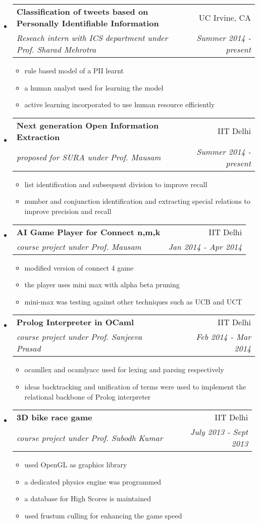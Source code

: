 \documentclass[letterpaper,11pt]{article}
\makeatletter
\newcommand{\ressubheading}[4]{
\begin{tabular*}{6.5in}{l@{\extracolsep{\fill}}r}
		\textbf{#1} & #2 \\
		\textit{#3} & \textit{#4} \\
\end{tabular*}\vspace{-6pt}}
\makeatother
\begin{document}
\begin{itemize}

\item 
\ressubheading{Classification of tweets based on Personally Identifiable Information}{UC Irvine, CA}{Reseach intern with ICS department under Prof. Sharad Mehrotra}{Summer 2014 - present}
\begin{itemize}
\item rule based model of a PII learnt
\item a human analyst used for learning the model
\item active learning incorporated to use human resource efficiently
\end{itemize}

\item
\ressubheading{Next generation Open Information Extraction}{IIT Delhi}{proposed for SURA under Prof. Mausam}{Summer 2014 - present}
\begin{itemize}
\item list identification and subsequent division to improve recall
\item number and conjunction identification and extracting special relations to improve precision and recall
\end{itemize}

\item
\ressubheading{AI Game Player for Connect n,m,k}{IIT Delhi}{course project under Prof. Mausam}{Jan 2014 - Apr 2014}
\begin{itemize}
\item modified version of connect 4 game
\item the player uses mini max with alpha beta pruning
\item mini-max was testing against other techniques such as UCB and UCT
\end{itemize}


\item
\ressubheading{Prolog Interpreter in OCaml}{IIT Delhi}{course project under Prof. Sanjeeva Prasad}{Feb 2014 - Mar 2014}
\begin{itemize}
\item ocamllex and ocamlyacc used for lexing and parsing respectively 
\item ideas backtracking and unification of terms were used to implement the relational backbone of Prolog interpreter
\end{itemize}

\item
\ressubheading{3D bike race game}{IIT Delhi}{course project under Prof. Subodh Kumar}{July 2013 - Sept 2013­}
\begin{itemize}
\item used OpenGL as graphics library
\item a dedicated physics engine was programmed
\item a database for High Scores is maintained
\item used frustum culling for enhancing the game speed
\end{itemize}



\end{itemize}
\end{document}
